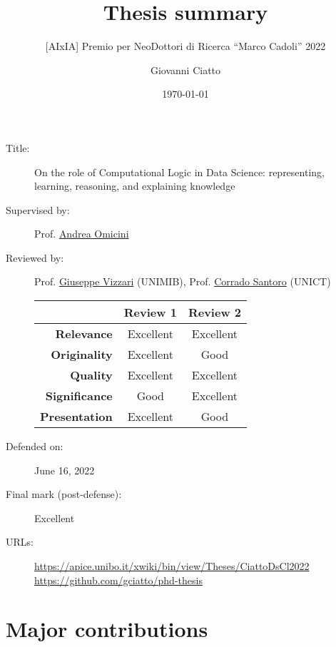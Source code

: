 \documentclass[12pt]{scrartcl}
\title{Thesis summary}
\subtitle{[AIxIA] Premio per NeoDottori di Ricerca ``Marco Cadoli'' 2022}
\author{Giovanni Ciatto}
\date{\today}
\begin{document}
\maketitle


\begin{description}
    \item[Title:] On the role of Computational Logic in Data Science: representing, learning, reasoning, and explaining knowledge
    \item[Supervised by:] Prof. \href{mailto:andrea.omicini@unibo.it}{Andrea Omicini}
    \item[Reviewed by:] Prof. \href{mailto:giuseppe.vizzari@unimib.it}{Giuseppe Vizzari} (UNIMIB), Prof. \href{mailto:santoro@dmi.unict.it}{Corrado Santoro} (UNICT)
    \begin{center}
        \begin{tabular}{r||c|c}
            & \textbf{Review 1} & \textbf{Review 2}
            \\\hline\hline
            \textbf{Relevance}    & Excellent         & Excellent         \\
            \textbf{Originality}  & Excellent         & Good              \\
            \textbf{Quality}      & Excellent         & Excellent         \\
            \textbf{Significance} & Good              & Excellent         \\
            \textbf{Presentation} & Excellent         & Good
        \end{tabular}
    \end{center}
    \item[Defended on:] June 16, 2022
    \item[Final mark (post-defense):] Excellent
    \item[URLs:] \url{https://apice.unibo.it/xwiki/bin/view/Theses/CiattoDsCl2022}
    \\
    \url{https://github.com/gciatto/phd-thesis}
\end{description}

\pagebreak

\section*{Major contributions}
\end{document}
